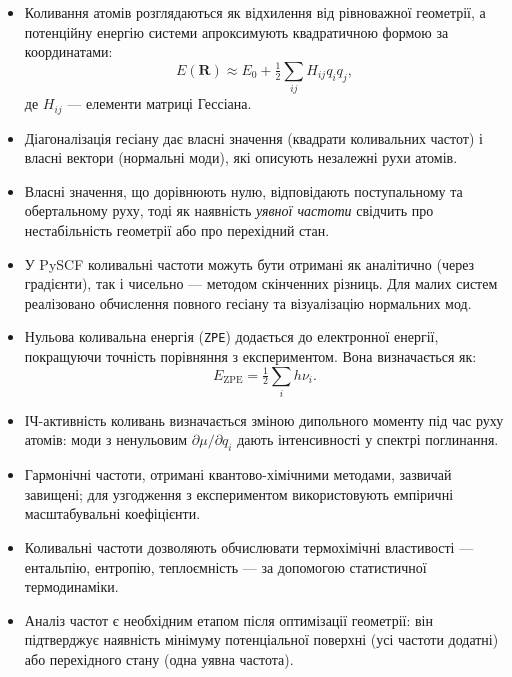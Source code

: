 \begin{itemize}
    \item Коливання атомів розглядаються як відхилення від рівноважної геометрії,
    а потенційну енергію системи апроксимують квадратичною формою за координатами:
    \[
    E(\mathbf{R}) \approx E_0 + \tfrac{1}{2} \sum_{ij} H_{ij} q_i q_j,
    \]
    де $H_{ij}$ — елементи матриці Гессіана.

    \item Діагоналізація гесіану дає власні значення (квадрати коливальних частот)
    і власні вектори (нормальні моди), які описують незалежні рухи атомів.

    \item Власні значення, що дорівнюють нулю, відповідають поступальному та обертальному руху,
    тоді як наявність \textit{уявної частоти} свідчить про нестабільність геометрії
    або про перехідний стан.

    \item У PySCF коливальні частоти можуть бути отримані як аналітично (через градієнти),
    так і чисельно — методом скінченних різниць. Для малих систем реалізовано обчислення
    повного гесіану та візуалізацію нормальних мод.

    \item Нульова коливальна енергія (\texttt{ZPE}) додається до електронної енергії,
    покращуючи точність порівняння з експериментом.
    Вона визначається як:
    \[
    E_\mathrm{ZPE} = \tfrac{1}{2} \sum_i h\nu_i.
    \]

    \item ІЧ-активність коливань визначається зміною дипольного моменту під час руху атомів:
    моди з ненульовим $\partial \mu / \partial q_i$ дають інтенсивності у спектрі поглинання.

    \item Гармонічні частоти, отримані квантово-хімічними методами, зазвичай завищені;
    для узгодження з експериментом використовують емпіричні масштабувальні коефіцієнти.

    \item Коливальні частоти дозволяють обчислювати термохімічні властивості —
    ентальпію, ентропію, теплоємність — за допомогою статистичної термодинаміки.

    \item Аналіз частот є необхідним етапом після оптимізації геометрії:
    він підтверджує наявність мінімуму потенціальної поверхні
    (усі частоти додатні) або перехідного стану (одна уявна частота).
\end{itemize}

